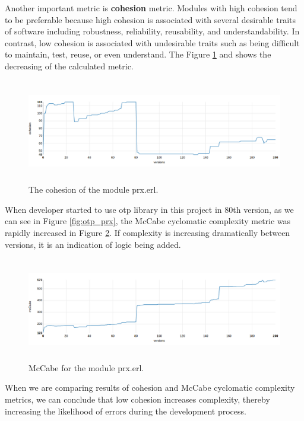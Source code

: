 Another important metric is \textbf{cohesion} metric. Modules with high cohesion tend to be preferable because high cohesion is associated with several desirable traits of software including robustness, reliability, reusability, and understandability. In contrast, low cohesion is associated with undesirable traits such as being difficult to maintain, test, reuse, or even understand. 
The Figure \ref{fig:cohesion_prx} and shows the decreasing of the calculated metric. 

\begin{figure}[h]
	\centering
	\includegraphics[height=45mm]{figures/cohesion_prx.png}
	\caption{The cohesion of the module prx.erl.}
	\label{fig:cohesion_prx}
\end{figure}

When developer started to use otp library in this project in 80th version, as we can see in Figure \ref{fig:otp_prx}, the McCabe cyclomatic complexity metric was rapidly increased in Figure \ref{fig:McCabe}. If complexity is increasing dramatically between versions, it is an indication of logic 
being added. 

\begin{figure}[h]
	\centering
	\includegraphics[height=45mm]{figures/mccabe.png}
	\caption{McCabe for the module prx.erl.}
	\label{fig:McCabe}
\end{figure}

When we are comparing results of cohesion and McCabe cyclomatic complexity metrics, we can conclude that low cohesion increases complexity, thereby increasing the likelihood of errors during the development process.

